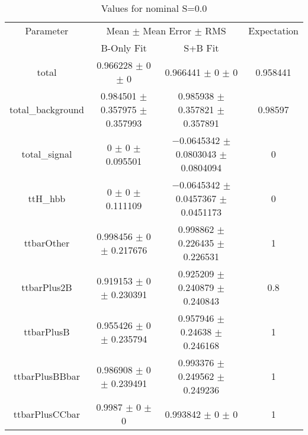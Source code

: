 \begin{table}
\centering
\caption{Values for nominal S=0.0}
\begin{tabular}{cccc}
\toprule
Parameter & \multicolumn{2}{c}{Mean $\pm$ Mean Error $\pm$ RMS} & Expectation\\
 & B-Only Fit & S+B Fit & \\
\midrule
total & \num{0.966228} $\pm$ \num{0} $\pm$ \num{0} & \num{0.966441} $\pm$ \num{0} $\pm$ \num{0} & \num{0.958441}\\
total\_background & \num{0.984501} $\pm$ \num{0.357975} $\pm$ \num{0.357993} & \num{0.985938} $\pm$ \num{0.357821} $\pm$ \num{0.357891} & \num{0.98597}\\
total\_signal & \num{0} $\pm$ \num{0} $\pm$ \num{0.095501} & \num{-0.0645342} $\pm$ \num{0.0803043} $\pm$ \num{0.0804094} & \num{0}\\
ttH\_hbb & \num{0} $\pm$ \num{0} $\pm$ \num{0.111109} & \num{-0.0645342} $\pm$ \num{0.0457367} $\pm$ \num{0.0451173} & \num{0}\\
ttbarOther & \num{0.998456} $\pm$ \num{0} $\pm$ \num{0.217676} & \num{0.998862} $\pm$ \num{0.226435} $\pm$ \num{0.226531} & \num{1}\\
ttbarPlus2B & \num{0.919153} $\pm$ \num{0} $\pm$ \num{0.230391} & \num{0.925209} $\pm$ \num{0.240879} $\pm$ \num{0.240843} & \num{0.8}\\
ttbarPlusB & \num{0.955426} $\pm$ \num{0} $\pm$ \num{0.235794} & \num{0.957946} $\pm$ \num{0.24638} $\pm$ \num{0.246168} & \num{1}\\
ttbarPlusBBbar & \num{0.986908} $\pm$ \num{0} $\pm$ \num{0.239491} & \num{0.993376} $\pm$ \num{0.249562} $\pm$ \num{0.249236} & \num{1}\\
ttbarPlusCCbar & \num{0.9987} $\pm$ \num{0} $\pm$ \num{0} & \num{0.993842} $\pm$ \num{0} $\pm$ \num{0} & \num{1}\\
\bottomrule
\end{tabular}
\end{table}
